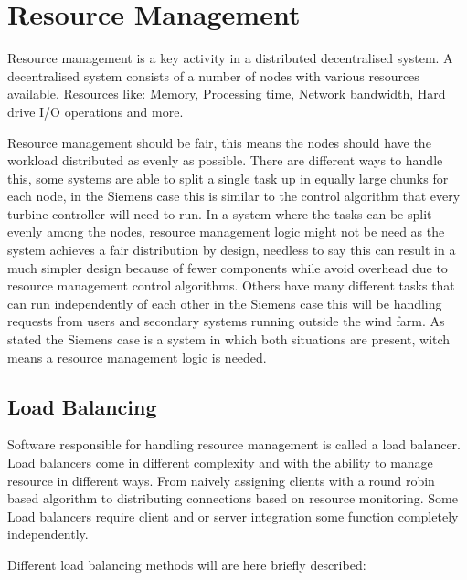 \chapter{Resource Management} %

Resource management is a key activity in a distributed decentralised system.
A decentralised system consists of a number of nodes with various resources available. 
Resources like: Memory, Processing time, Network bandwidth, Hard drive I/O operations and more. 

Resource management should be fair, this means the nodes should have the workload distributed as evenly as possible.
There are different ways to handle this, some systems are able to split a single task up in equally large chunks for each node, in the Siemens case this is similar to the control algorithm that every turbine controller will need to run.
In a system where the tasks can be split evenly among the nodes, resource management logic might not be need as the system achieves a fair distribution by design, needless to say this can result in a much simpler design because of fewer components while avoid overhead due to resource management control algorithms. %
Others have many different tasks that can run independently of each other in the Siemens case this will be handling requests from users and secondary systems running outside the wind farm.
As stated the Siemens case is a system in which both situations are present, witch means a resource management logic is needed.

\section{Load Balancing}
Software responsible for handling resource management is called a load balancer.
Load balancers come in different complexity and with the ability to manage resource in different ways. From naively assigning clients with a round robin based algorithm to distributing connections based on resource monitoring. Some Load balancers require client and or server integration some function completely independently.

Different load balancing methods will are here briefly described:
